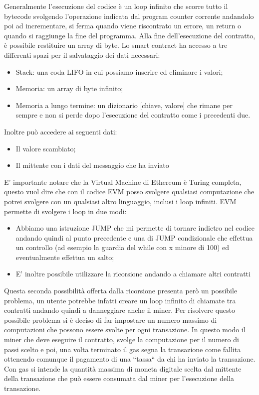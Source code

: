 \documentclass[12pt]{report}
\begin{document}
Generalmente l'esecuzione del codice è un loop infinito che scorre tutto il bytecode svolgendo l'operazione indicata dal program counter corrente andandolo poi ad incrementare, si ferma quando viene riscontrato un errore, un return o quando si raggiunge la fine del programma.
Alla fine dell'esecuzione del contratto, è possibile restituire un array di byte.
Lo smart contract ha accesso a tre differenti spazi per il salvataggio dei dati necessari:

\begin{itemize}
\item Stack: una coda LIFO in cui possiamo inserire ed eliminare i valori;
\item Memoria: un array di byte infinito;
\item Memoria a lungo termine: un dizionario [chiave, valore] che rimane per sempre e non si perde dopo l'esecuzione del contratto come i precedenti due.
\end{itemize}

Inoltre può accedere ai seguenti dati:

\begin{itemize}
\item Il valore scambiato;
\item Il mittente con i dati del messaggio che ha inviato
\end{itemize}

E' importante notare che la Virtual Machine di Ethereum è Turing completa, questo vuol dire che con il codice EVM posso svolgere qualsiasi computazione che potrei svolgere con un qualsiasi altro linguaggio, inclusi i loop infiniti.
EVM permette di svolgere i loop in due modi:
\begin{itemize}
\item Abbiamo una istruzione JUMP che mi permette di tornare indietro nel codice andando quindi al punto precedente e una di JUMP condizionale che effettua un controllo (ad esempio la guardia del while con x minore di 100) ed eventualmente effettua un salto;
\item E' inoltre possibile utilizzare la ricorsione andando a chiamare altri contratti
\end{itemize}

Questa seconda possibilità offerta dalla ricorsione presenta però un possibile problema, un utente potrebbe infatti creare un loop infinito di chiamate tra contratti andando quindi a danneggiare anche il miner.
Per risolvere questo possibile problema si è deciso di far impostare un numero massimo di computazioni che possono essere svolte per ogni transazione.
In questo modo il miner che deve eseguire il contratto, svolge la computazione per il numero di passi scelto e poi, una volta terminato il gas segna la transazione come fallita ottenendo comunque il pagamento di una ``tassa`` da chi ha inviato la transazione.
Con gas si intende la quantità massima di moneta digitale scelta dal mittente della transazione che può essere consumata dal miner per l'esecuzione della transazione.
\end{document}
